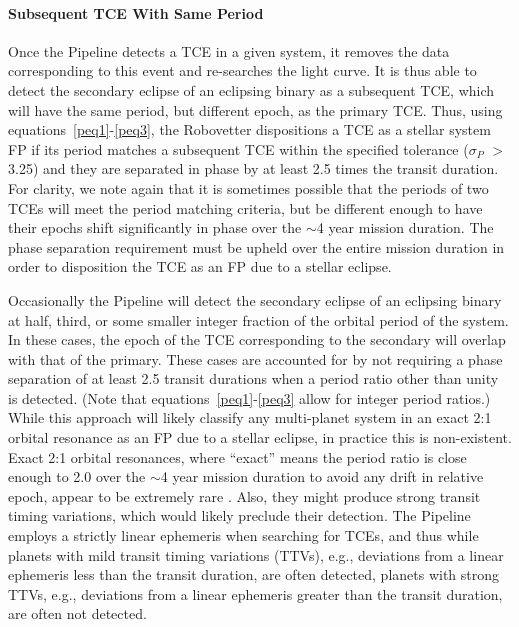 \paragraph{Subsequent TCE With Same Period}
\label{s:secondTce}
Once the \kepler{} Pipeline detects a TCE in a given system, it removes the data corresponding to this event and re-searches the light curve. It is thus able to detect the secondary eclipse of an eclipsing binary as a subsequent TCE, which will have the same period, but different epoch, as the primary TCE. Thus, using equations~\ref{peq1}-\ref{peq3}, the Robovetter dispositions a TCE as a stellar system FP if its period matches a subsequent TCE within the specified tolerance ($\sigma_{P}$ $>$ 3.25) and they are separated in phase by at least 2.5 times the transit duration. For clarity, we note again that it is sometimes possible that the periods of two TCEs will meet the period matching criteria, but be different enough to have their epochs shift significantly in phase over the $\sim$4 year mission duration. The phase separation requirement must be upheld over the entire mission duration in order to disposition the TCE as an FP due to a stellar eclipse.  

Occasionally the \kepler{} Pipeline will detect the secondary eclipse of an eclipsing binary at half, third, or some smaller integer fraction of the orbital period of the system. In these cases, the epoch of the TCE corresponding to the secondary will overlap with that of the primary. These cases are accounted for by not requiring a phase separation of at least 2.5 transit durations when a period ratio other than unity is detected. (Note that equations~\ref{peq1}-\ref{peq3} allow for integer period ratios.) While this approach will likely classify any multi-planet system in an exact 2:1 orbital resonance as an FP due to a stellar eclipse, in practice this is non-existent. Exact 2:1 orbital resonances, where ``exact'' means the period ratio is close enough to 2.0 over the $\sim$4 year mission duration to avoid any drift in relative epoch, appear to be extremely rare \citep{Fabrycky2014}. Also, they might produce strong transit timing variations, which would likely preclude their detection. The \kepler{} Pipeline employs a strictly linear ephemeris when searching for TCEs, and thus while planets with mild transit timing variations (TTVs), e.g., deviations from a linear ephemeris less than the transit duration, are often detected, planets with strong TTVs, e.g., deviations from a linear ephemeris greater than the transit duration, are often not detected.



